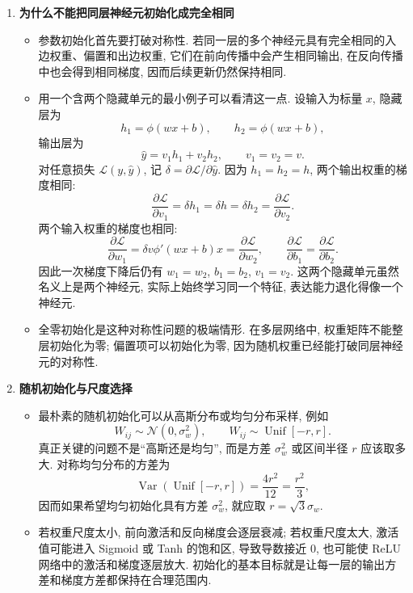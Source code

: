 \documentclass{../nndlcourse}
\begin{document}
\begin{enumerate}
  \item \textbf{为什么不能把同层神经元初始化成完全相同}
    \begin{itemize}
      \item 参数初始化首先要打破对称性. 若同一层的多个神经元具有完全相同的入边权重、偏置和出边权重, 它们在前向传播中会产生相同输出, 在反向传播中也会得到相同梯度, 因而后续更新仍然保持相同.
      \item 用一个含两个隐藏单元的最小例子可以看清这一点. 设输入为标量 $x$, 隐藏层为
      \[
        h_1=\phi(wx+b),
        \qquad
        h_2=\phi(wx+b),
      \]
      输出层为
      \[
        \hat{y}=v_1h_1+v_2h_2,
        \qquad
        v_1=v_2=v.
      \]
      对任意损失 $\mathcal{L}(y,\hat{y})$, 记 $\delta=\partial\mathcal{L}/\partial\hat{y}$. 因为 $h_1=h_2=h$, 两个输出权重的梯度相同:
      \[
        \frac{\partial \mathcal{L}}{\partial v_1}
        =
        \delta h_1
        =
        \delta h
        =
        \delta h_2
        =
        \frac{\partial \mathcal{L}}{\partial v_2}.
      \]
      两个输入权重的梯度也相同:
      \[
        \frac{\partial \mathcal{L}}{\partial w_1}
        =
        \delta v \phi'(wx+b)x
        =
        \frac{\partial \mathcal{L}}{\partial w_2},
        \qquad
        \frac{\partial \mathcal{L}}{\partial b_1}
        =
        \frac{\partial \mathcal{L}}{\partial b_2}.
      \]
      因此一次梯度下降后仍有 $w_1=w_2$, $b_1=b_2$, $v_1=v_2$. 这两个隐藏单元虽然名义上是两个神经元, 实际上始终学习同一个特征, 表达能力退化得像一个神经元.
      \item 全零初始化是这种对称性问题的极端情形. 在多层网络中, 权重矩阵不能整层初始化为零; 偏置项可以初始化为零, 因为随机权重已经能打破同层神经元的对称性.
    \end{itemize}
  \item \textbf{随机初始化与尺度选择}
    \begin{itemize}
      \item 最朴素的随机初始化可以从高斯分布或均匀分布采样, 例如
      \[
        W_{ij}\sim\mathcal{N}(0,\sigma_w^2),
        \qquad
        W_{ij}\sim\operatorname{Unif}[-r,r].
      \]
      真正关键的问题不是“高斯还是均匀”, 而是方差 $\sigma_w^2$ 或区间半径 $r$ 应该取多大. 对称均匀分布的方差为
      \[
        \operatorname{Var}\left(\operatorname{Unif}[-r,r]\right)
        =
        \frac{4r^2}{12}
        =
        \frac{r^2}{3},
      \]
      因而如果希望均匀初始化具有方差 $\sigma_w^2$, 就应取 $r=\sqrt{3}\sigma_w$.
      \item 若权重尺度太小, 前向激活和反向梯度会逐层衰减; 若权重尺度太大, 激活值可能进入 Sigmoid 或 Tanh 的饱和区, 导致导数接近 $0$, 也可能使 ReLU 网络中的激活和梯度逐层放大. 初始化的基本目标就是让每一层的输出方差和梯度方差都保持在合理范围内.

\end{itemize}
\end{enumerate}
\end{document}
